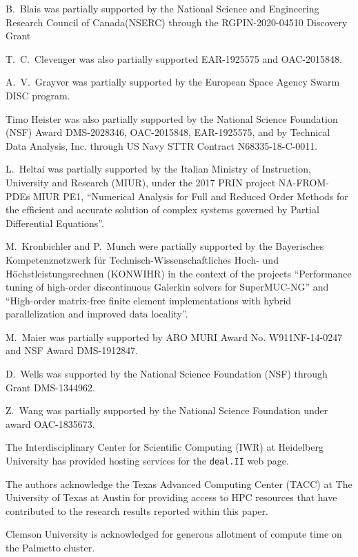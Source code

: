 \documentclass{ansarticle-preprint}
\newcommand{\specialword}[1]{\texttt{#1}}
\newcommand{\dealii}{{\specialword{deal.II}}\xspace}
\begin{document}

B.~Blais was partially supported by the National Science and Engineering Research Council of Canada(NSERC)  through the RGPIN-2020-04510 Discovery Grant

T.~C.~Clevenger was also partially supported EAR-1925575 and OAC-2015848.

A.~V.~Grayver was partially supported by the European Space Agency
Swarm DISC program.

Timo Heister was also partially supported by the National Science Foundation (NSF)
Award DMS-2028346, OAC-2015848, EAR-1925575, and by
Technical Data Analysis, Inc. through US Navy STTR Contract N68335-18-C-0011.

L.~Heltai was partially supported by the Italian Ministry of Instruction,
University and Research (MIUR), under the 2017 PRIN project NA-FROM-PDEs MIUR
PE1, ``Numerical Analysis for Full and Reduced Order Methods for the efficient
and accurate solution of complex systems governed by Partial Differential
Equations''.

M.~Kronbichler and P.~Munch were partially supported by the
Bayerisches Kompetenznetzwerk
f\"ur Technisch-Wissen\-schaft\-li\-ches Hoch- und H\"ochstleistungsrechnen
(KONWIHR) in the context of the projects
``Performance tuning of high-order discontinuous Galerkin solvers for
SuperMUC-NG'' and ``High-order matrix-free finite element implementations with
hybrid parallelization and improved data locality''.

M.~Maier was partially supported by ARO MURI Award No. W911NF-14-0247 and
NSF Award DMS-1912847.

D.~Wells was supported by the National Science Foundation (NSF) through Grant
DMS-1344962.

Z.~Wang was partially
supported by the National Science Foundation under award OAC-1835673.

The Interdisciplinary Center for Scientific Computing (IWR) at Heidelberg
University has provided hosting services for the \dealii{} web page.


The authors acknowledge the Texas Advanced Computing Center (TACC) at The
University of Texas at Austin for providing access to HPC resources that have
contributed to the research results reported within this paper.

Clemson University is acknowledged for generous allotment of compute time on
the Palmetto cluster.


{}

\end{document}
